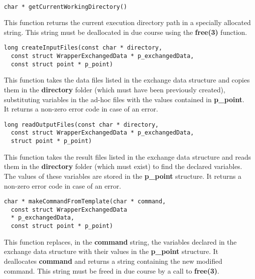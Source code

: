 \ \\
\lstset{language=C++, basicstyle=\normalsize}
\begin{lstlisting}[frame=TRBL]
  char * getCurrentWorkingDirectory()
\end{lstlisting}

This function returns the current execution directory path in a specially allocated string. This string must be deallocated in due course using the {\bf free(3)} function.

\lstset{language=C++, basicstyle=\normalsize}
\begin{lstlisting}[frame=TRBL]
  long createInputFiles(const char * directory,
  const struct WrapperExchangedData * p_exchangedData,
  const struct point * p_point)
\end{lstlisting}

This function takes the data files listed in the exchange data structure and copies them in the {\bf directory} folder (which must have been previously created), substituting variables in the ad-hoc files with the values contained in {\bf p\_point}. It returns a non-zero error code in case of an error.

\lstset{language=C++, basicstyle=\normalsize}
\begin{lstlisting}[frame=TRBL]
  long readOutputFiles(const char * directory,
  const struct WrapperExchangedData * p_exchangedData,
  struct point * p_point)
\end{lstlisting}

This function takes the result files listed in the exchange data structure and reads them in the {\bf directory} folder (which must exist) to find the declared variables. The values of these variables are stored in the {\bf p\_point} structure. It returns a non-zero error code in case of an error.

\lstset{language=C++, basicstyle=\normalsize}
\begin{lstlisting}[frame=TRBL]
  char * makeCommandFromTemplate(char * command,
  const struct WrapperExchangedData
  * p_exchangedData,
  const struct point * p_point)
\end{lstlisting}

This function replaces, in the {\bf command} string, the variables declared in the exchange data structure with their values in the {\bf p\_point} structure. It deallocates {\bf command} and returns a string containing the new modified command. This string must be freed in due course by a call to {\bf free(3)}.

